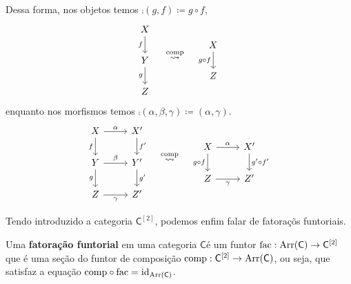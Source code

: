 Dessa forma, nos objetos temos $\comp(g,f) \coloneqq g \circ f$,
\begin{displaymath}
  \begin{tikzcd}
    X
    \arrow[d, "f" swap]
    \\ Y
    \arrow[d, "g" swap]
    \\ Z
  \end{tikzcd}
  \quad \overset{\comp}{\rightsquigarrow} \quad
  \begin{tikzcd}
    X
    \arrow[d, "g \circ f" swap]
    \\ Z
  \end{tikzcd}
\end{displaymath}
enquanto nos morfismos temos $\comp(\alpha,\beta,\gamma) \coloneqq (\alpha,\gamma)$.
\begin{displaymath}
  \begin{tikzcd}
    X
    \arrow[d, "f" swap]
    \arrow[r, "\alpha"]
    & X'
    \arrow[d, "f'"]
    \\ Y
    \arrow[d, "g" swap]
    \arrow[r, "\beta"]
    & Y'
    \arrow[d, "g'"]
    \\ Z
    \arrow[r, "\gamma" swap]
    & Z'
  \end{tikzcd}
  \quad \overset{\comp}{\rightsquigarrow} \quad
  \begin{tikzcd}
    X
    \arrow[d, "g \circ f" swap]
    \arrow[r, "\alpha"]
    & X'
    \arrow[d, "g' \circ f'"]
    \\ Z
    \arrow[r, "\gamma" swap]
    & Z'
  \end{tikzcd}
\end{displaymath}

Tendo introduzido a categoria $\mathsf{C}^{[2]}$, podemos enfim falar de fatoraçõs funtoriais.

\begin{defin}\label{defin:fatoracao_funtorial}
  Uma \textbf{fatoração funtorial} em uma categoria $\mathsf{C}$é  um funtor $\mathrm{fac}: \mathrm{Arr}(\mathsf{C}) \to \mathsf{C}^{[2]}$ que é uma seção do funtor de composição $\mathrm{comp}: \mathsf{C}^{[2]} \to \mathrm{Arr}(\mathsf{C})$, ou seja, que satisfaz a equação $\mathrm{comp} \circ \mathrm{fac} = \mathrm{id}_{\mathsf{\mathrm{Arr}(\mathsf{C})}}$.
\end{defin}

